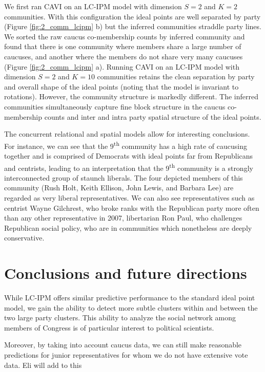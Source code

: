 \documentclass{article}
\begin{document}
We first ran CAVI on an LC-IPM model with dimension $S=2$ and $K=2$ communities. With this configuration the ideal points are well separated by party (Figure \ref{fig:2_comm_lcipm} b) but the inferred communities straddle party lines. We sorted the raw caucus co-membership counts by inferred community and found that there is one community where members share a large number of caucuses, and another where the members do not share very many caucuses (Figure \ref{fig:2_comm_lcipm} a). Running CAVI on an LC-IPM model with dimension $S=2$ and $K=10$ communities retains the clean separation by party and overall shape of the ideal points (noting that the model is invariant to rotations). However, the community structure is markedly different. The inferred communities simultaneously capture fine block structure in the caucus co-membership counts and inter and intra party spatial structure of the ideal points. 

The concurrent relational and spatial models allow for interesting conclusions. For instance, we can see that the 9\textsuperscript{th} community has a high rate of caucusing together and is comprised of Democrats with ideal points far from Republicans and centrists, leading to an interpretation that the 9\textsuperscript{th} community is a strongly interconnected group of staunch liberals. The four depicted members of this community (Rush Holt, Keith Ellison, John Lewis, and Barbara Lee) are regarded as very liberal representatives. We can also see representatives such as centrist Wayne Gilchrest, who broke ranks with the Republican party more often than any other representative in 2007, libertarian Ron Paul, who challenges Republican social policy, who are in communities which nonetheless are deeply conservative.

\section{Conclusions and future directions} 
While LC-IPM offers similar predictive performance to the standard ideal point model, we gain the ability to detect more subtle clusters within and between the two large party clusters. This ability to analyze the social network among members of Congress is of particular interest to political scientists. \par

Moreover, by taking into account caucus data, we can still make reasonable predictions for junior representatives for whom we do not have extensive vote data.  {\color{red} Eli will add to this}  \par
\end{document}
